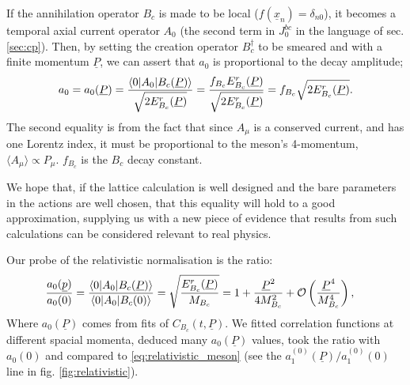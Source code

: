 If the annihilation operator $B_c$ is made to be local ($f(\underline{x}_n)=\delta_{n0}$), it becomes a temporal axial current operator $A_0$ (the second term in $J^{bc}_0$ 
in the language of sec. \ref{sec:cp}). Then, by setting the creation operator $B_c^{\dagger}$ to be smeared and with a finite 
momentum $\underline{P}$, we can assert that $a_0$ is proportional to the decay amplitude;
\begin{align}
	a_0 = a_0(\underline{P}) = {\langle 0 | A_0 | B_c(\underline{P}) \rangle \over \sqrt{2E^r_{B_c}(\underline{P})} } 
	= {f_{B_c} E^r_{B_c}(\underline{P}) \over \sqrt{2E^r_{B_c}(\underline{P})}} = f_{B_c} \sqrt{2E^r_{B_c}(\underline{P})}.
\end{align}
The second equality is from the fact that since $A_{\mu}$ is a conserved current, and has one Lorentz index, it must be proportional to the meson's 4-momentum, 
$\langle A_{\mu} \rangle \propto P_{\mu}$. $f_{B_c}$ is the $B_c$ decay constant.

We hope that, if the lattice calculation is well designed and the 
bare parameters in the actions are well chosen, that this equality will hold to a good approximation, supplying us with a new piece of evidence that results 
from such calculations can be considered relevant to real physics.

Our probe of the relativistic normalisation is the ratio:
\begin{align}
	{a_0(\underline{p})\over a_0(0)} & = {\langle 0 | A_0 | B_c(\underline{P}) \rangle \over \langle 0 | A_0 | B_c(0) \rangle} = 
	\sqrt{E^r_{B_c}(\underline{P})\over M_{B_c}} = 1 + {\underline{P}^2\over 4M_{B_c}^2} + \mathcal{O}\left({\underline{P}^4\over M_{B_c}^4}\right),
	\label{eq:relativistic_meson}
\end{align}
Where $a_0(\underline{P})$ comes from fits of $C_{B_c}(t,\underline{P})$.
We fitted correlation functions at different spacial momenta, deduced many $a_0(\underline{P})$ values, took the ratio with $a_0(0)$ and compared to 
\eqref{eq:relativistic_meson} (see the $a^{(0)}_1(\underline{P})/a^{(0)}_1(0)$ line in fig. \ref{fig:relativistic}).

